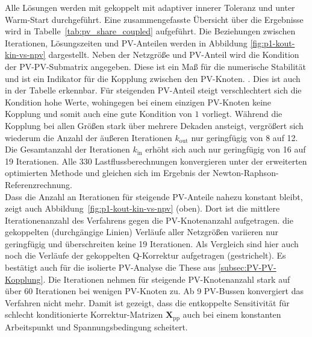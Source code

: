 Alle Lösungen werden mit gekoppelt mit adaptiver innerer Toleranz und unter Warm-Start durchgeführt.
Eine zusammengefasste Übersicht über die Ergebnisse wird in Tabelle~\ref{tab:pv_share_coupled} aufgeführt.
Die Beziehungen zwischen Iterationen, Lösungszeiten und PV-Anteilen werden in Abbildung \ref{fig:p1-kout-kin-vs-npv} dargestellt.
Neben der Netzgröße und PV-Anteil wird die Kondition der PV-PV-Submatrix angegeben. 
Diese ist ein Maß für die numerische Stabilität und ist ein Indikator für die Kopplung zwischen den PV-Knoten. \cite{bibid}.
Dies ist auch in der Tabelle erkennbar.
Für steigenden PV-Anteil steigt verschlechtert sich die Kondition hohe Werte, wohingegen bei einem einzigen PV-Knoten keine Kopplung und somit auch eine gute Kondition von $1$ vorliegt.
Während die Kopplung bei allen Größen stark über mehrere Dekaden ansteigt, vergrößert sich wiederum die Anzahl der äußeren Iterationen $k_\mathrm{out}$ nur geringfügig von 8 auf 12.
Die Gesamtanzahl der Iterationen $k_\mathrm{in}$ erhöht sich auch nur geringfügig von 16 auf 19 Iterationen.
Alle 330 Lastflussberechnungen konvergieren unter der erweiterten optimierten Methode und gleichen sich im Ergebnis der Newton-Raphson-Referenzrechnung.\\

Dass die Anzahl an Iterationen für steigende PV-Anteile nahezu konstant bleibt, zeigt auch Abbildung~\ref{fig:p1-kout-kin-vs-npv} (oben).
Dort ist die mittlere Iterationenanzahl des Verfahrens gegen die PV-Knotenanzahl aufgetragen. 
die gekoppelten (durchgängige Linien) Verläufe aller Netzgrößen variieren nur geringfügig und überschreiten keine 19 Iterationen. 
Als Vergleich sind hier auch noch die Verläufe der gekoppelten Q-Korrektur aufgetragen (gestrichelt).
Es bestätigt auch für die isolierte PV-Analyse die These aus \cref{subsec:PV-PV-Kopplung}.
Die Iterationen nehmen für steigende PV-Knotenanzahl stark auf über 60 Iterationen bei wenigen PV-Knoten zu.
Ab 9 PV-Bussen konvergiert das Verfahren nicht mehr.
Damit ist gezeigt, dass die entkoppelte Sensitivität für schlecht konditionierte Korrektur-Matrizen $\mathbf{X}_\mathrm{pp}$ auch bei einem konstanten Arbeitspunkt und Spannungsbedingung scheitert.\\









